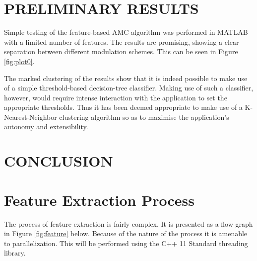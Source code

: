 \documentclass[10pt,onecolumn]{witseiepaper}
\begin{document}
\begin{multicols}{2}

\section{PRELIMINARY RESULTS}
	Simple testing of the feature-based AMC algorithm was performed in MATLAB with a limited number of features. The results are promising, showing a clear separation between different modulation schemes. This can be seen in Figure \ref{fig:plot0}. 

	The marked clustering of the results show that it is indeed possible to make use of a simple threshold-based decision-tree classifier. Making use of such a classifier, however, would require intense interaction with the application to set the appropriate thresholds. Thus it has been deemed appropriate to make use of a K-Nearest-Neighbor clustering algorithm so as to maximise the application's autonomy and extensibility.

\section{CONCLUSION}



 
\end{multicols}
\newpage

\appendix
{}
\section{Feature Extraction Process}
\label{app:feature}
The process of feature extraction is fairly complex. It is presented as a flow graph in Figure \ref{fig:feature} below. Because of the nature of the process it is amenable to parallelization. This will be performed using the C++ 11 Standard threading library.
\end{document}
